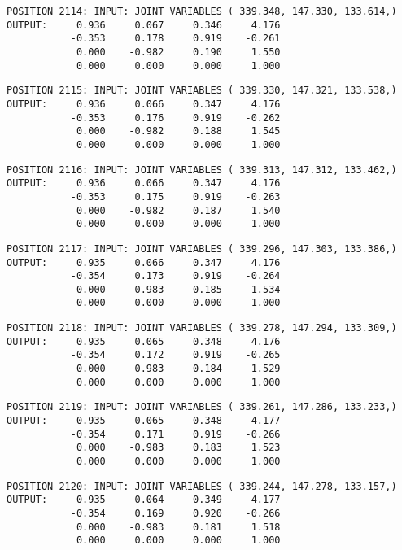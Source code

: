 \begin{verbatim}
POSITION 2114: INPUT: JOINT VARIABLES ( 339.348, 147.330, 133.614,)
OUTPUT:     0.936     0.067     0.346     4.176
           -0.353     0.178     0.919    -0.261
            0.000    -0.982     0.190     1.550
            0.000     0.000     0.000     1.000
\end{verbatim} \pagebreak[1]\begin{verbatim}
POSITION 2115: INPUT: JOINT VARIABLES ( 339.330, 147.321, 133.538,)
OUTPUT:     0.936     0.066     0.347     4.176
           -0.353     0.176     0.919    -0.262
            0.000    -0.982     0.188     1.545
            0.000     0.000     0.000     1.000
\end{verbatim} \pagebreak[1]\begin{verbatim}
POSITION 2116: INPUT: JOINT VARIABLES ( 339.313, 147.312, 133.462,)
OUTPUT:     0.936     0.066     0.347     4.176
           -0.353     0.175     0.919    -0.263
            0.000    -0.982     0.187     1.540
            0.000     0.000     0.000     1.000
\end{verbatim} \pagebreak[1]\begin{verbatim}
POSITION 2117: INPUT: JOINT VARIABLES ( 339.296, 147.303, 133.386,)
OUTPUT:     0.935     0.066     0.347     4.176
           -0.354     0.173     0.919    -0.264
            0.000    -0.983     0.185     1.534
            0.000     0.000     0.000     1.000
\end{verbatim} \pagebreak[1]\begin{verbatim}
POSITION 2118: INPUT: JOINT VARIABLES ( 339.278, 147.294, 133.309,)
OUTPUT:     0.935     0.065     0.348     4.176
           -0.354     0.172     0.919    -0.265
            0.000    -0.983     0.184     1.529
            0.000     0.000     0.000     1.000
\end{verbatim} \pagebreak[1]\begin{verbatim}
POSITION 2119: INPUT: JOINT VARIABLES ( 339.261, 147.286, 133.233,)
OUTPUT:     0.935     0.065     0.348     4.177
           -0.354     0.171     0.919    -0.266
            0.000    -0.983     0.183     1.523
            0.000     0.000     0.000     1.000
\end{verbatim} \pagebreak[1]\begin{verbatim}
POSITION 2120: INPUT: JOINT VARIABLES ( 339.244, 147.278, 133.157,)
OUTPUT:     0.935     0.064     0.349     4.177
           -0.354     0.169     0.920    -0.266
            0.000    -0.983     0.181     1.518
            0.000     0.000     0.000     1.000
\end{verbatim} \pagebreak[1]\begin{verbatim}

\end{verbatim}
